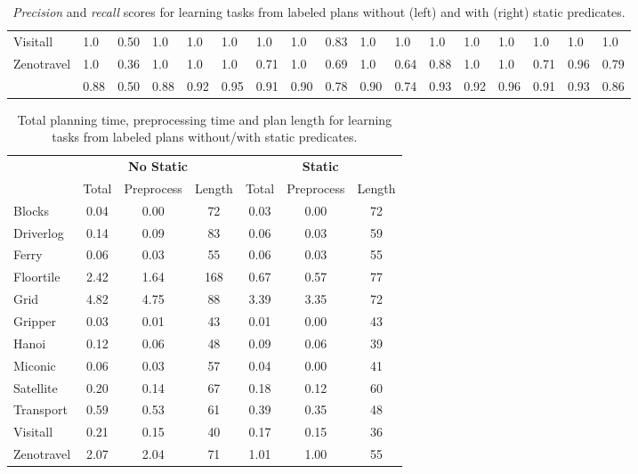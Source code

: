 \documentclass[3p,times]{elsarticle}
\begin{document}
\begin{table*}[hbt!]
{\begin{tabular}{l|l|l|l|l|l|l||l|l||l|l|l|l|l|l||l|l|}
			Visitall & 1.0 & 0.50 & 1.0 & 1.0 & 1.0 & 1.0 & 1.0 & 0.83 & 1.0 & 1.0 & 1.0 & 1.0 & 1.0 & 1.0 & 1.0 & 1.0\\
			Zenotravel & 1.0 & 0.36 & 1.0 & 1.0 & 1.0 & 0.71 & 1.0 & 0.69 &1.0 & 0.64 & 0.88 & 1.0 & 1.0 & 0.71 & 0.96 & 0.79\\
			\hline
			\bf  & 0.88 & 0.50 & 0.88 & 0.92 & 0.95 & 0.91 & 0.90 & 0.78 & 0.90 & 0.74 & 0.93 & 0.92 & 0.96 & 0.91 & 0.93 & 0.86\\
		\end{tabular}
	}
\caption{\small {\em Precision} and {\em recall} scores for learning tasks from labeled plans without (left) and with (right) static predicates.}
\label{tab:results_plans}
\end{table*}

\begin{table}
\begin{scriptsize}
	\begin{center}
		\begin{tabular}{l|c|c|c||c|c|c|}
                         & \multicolumn{3}{|c||}{\bf No Static}& \multicolumn{3}{|c|}{\bf Static}\\
			 & Total & Preprocess & Length  & Total & Preprocess &  Length\\
                         \hline
			Blocks & 0.04 & 0.00 & 72  & 0.03 & 0.00 & 72 \\
			Driverlog & 0.14 & 0.09 & 83 & 0.06 & 0.03 & 59 \\
			Ferry & 0.06 & 0.03 & 55 & 0.06 & 0.03 & 55 \\
			Floortile & 2.42 & 1.64 & 168 & 0.67 & 0.57 & 77 \\
			Grid & 4.82 & 4.75 & 88 & 3.39 & 3.35 & 72 \\
			Gripper & 0.03 & 0.01 & 43 & 0.01 & 0.00 & 43 \\
                        Hanoi & 0.12 & 0.06 & 48 & 0.09 & 0.06 & 39 \\
                        Miconic & 0.06 & 0.03 & 57 & 0.04 & 0.00 & 41 \\
			Satellite & 0.20 & 0.14 & 67 & 0.18 & 0.12 & 60 \\
			Transport & 0.59 & 0.53 & 61 & 0.39 & 0.35 & 48 \\
			Visitall & 0.21 & 0.15 & 40 & 0.17 & 0.15 & 36 \\
			Zenotravel & 2.07 & 2.04 & 71 & 1.01 & 1.00 & 55 \\			
		\end{tabular}
	\end{center}
        \end{scriptsize}
	\caption{\small Total planning time, preprocessing time and plan length for learning tasks from labeled plans without/with static predicates.}
	\label{tab:time_plans}	
\end{table}
\end{document}
